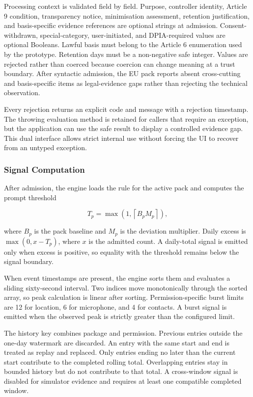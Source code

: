 Processing context is validated field by field. Purpose, controller identity, Article 9 condition, transparency notice, minimisation assessment, retention justification, and basis-specific evidence references are optional strings at admission. Consent-withdrawn, special-category, user-initiated, and DPIA-required values are optional Booleans. Lawful basis must belong to the Article 6 enumeration used by the prototype. Retention days must be a non-negative safe integer. Values are rejected rather than coerced because coercion can change meaning at a trust boundary. After syntactic admission, the EU pack reports absent cross-cutting and basis-specific items as legal-evidence gaps rather than rejecting the technical observation.

Every rejection returns an explicit code and message with a rejection timestamp. The throwing evaluation method is retained for callers that require an exception, but the application can use the safe result to display a controlled evidence gap. This dual interface allows strict internal use without forcing the UI to recover from an untyped exception.

\subsubsection{Signal Computation}

After admission, the engine loads the rule for the active pack and computes the prompt threshold

\begin{equation}
T_p=\max\left(1,\left\lceil B_pM_p\right\rceil\right),
\end{equation}

where \(B_p\) is the pack baseline and \(M_p\) is the deviation multiplier. Daily excess is \(\max(0,x-T_p)\), where \(x\) is the admitted count. A daily-total signal is emitted only when excess is positive, so equality with the threshold remains below the signal boundary.

When event timestamps are present, the engine sorts them and evaluates a sliding sixty-second interval. Two indices move monotonically through the sorted array, so peak calculation is linear after sorting. Permission-specific burst limits are 12 for location, 6 for microphone, and 4 for contacts. A burst signal is emitted when the observed peak is strictly greater than the configured limit.

The history key combines package and permission. Previous entries outside the one-day watermark are discarded. An entry with the same start and end is treated as replay and replaced. Only entries ending no later than the current start contribute to the completed rolling total. Overlapping entries stay in bounded history but do not contribute to that total. A cross-window signal is disabled for simulator evidence and requires at least one compatible completed window.

